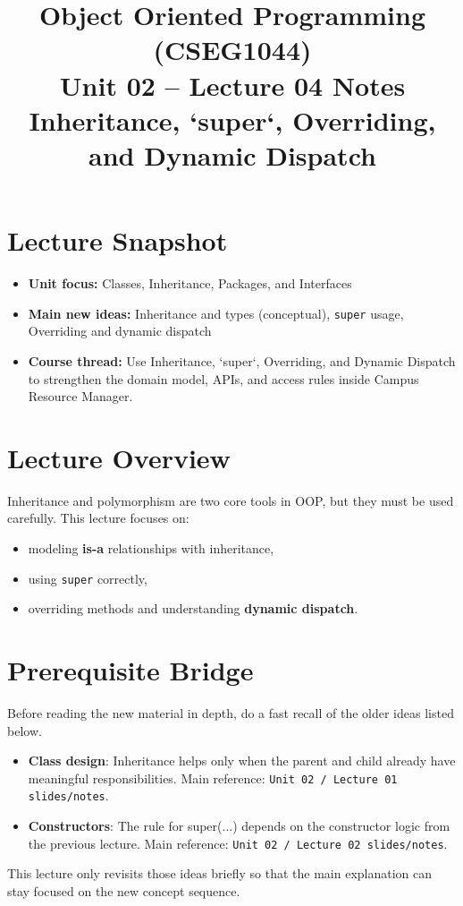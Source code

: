\documentclass[11pt]{article}
\title{Object Oriented Programming (CSEG1044)\\Unit 02 -- Lecture 04 Notes\\Inheritance, `super`, Overriding, and Dynamic Dispatch}
\begin{document}
\maketitle
\tableofcontents

\section{Lecture Snapshot}
\begin{itemize}
  \item \textbf{Unit focus:} Classes, Inheritance, Packages, and Interfaces
  \item \textbf{Main new ideas:} Inheritance and types (conceptual), \texttt{super} usage, Overriding and dynamic dispatch
  \item \textbf{Course thread:} Use Inheritance, `super`, Overriding, and Dynamic Dispatch to strengthen the domain model, APIs, and access rules inside Campus Resource Manager.
\end{itemize}
\notesources{\OOPSUnitIISources}

\section{Lecture Overview}
Inheritance and polymorphism are two core tools in OOP, but they must be used carefully.
This lecture focuses on:
\begin{itemize}
  \item modeling \textbf{is-a} relationships with inheritance,
  \item using \texttt{super} correctly,
  \item overriding methods and understanding \textbf{dynamic dispatch}.
\end{itemize}
\notesources{\OOPSUnitIISources}

\section{Prerequisite Bridge}
Before reading the new material in depth, do a fast recall of the older ideas listed below.
\begin{itemize}
  \item \textbf{Class design}: Inheritance helps only when the parent and child already have meaningful responsibilities. Main reference: \texttt{Unit 02 / Lecture 01 slides/notes}.
  \item \textbf{Constructors}: The rule for super(...) depends on the constructor logic from the previous lecture. Main reference: \texttt{Unit 02 / Lecture 02 slides/notes}.
\end{itemize}
This lecture only revisits those ideas briefly so that the main explanation can stay focused on the new concept sequence.
\notesources{\OOPSUnitIISources}
\end{document}
